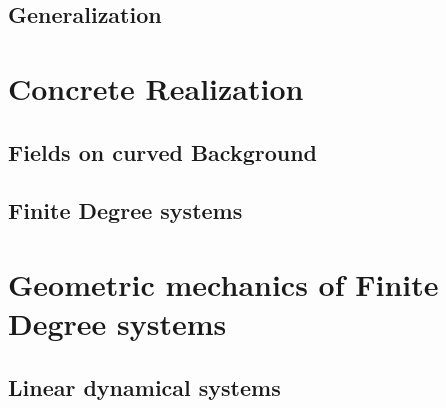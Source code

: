 \documentclass[Main]{subfiles}
\begin{document}
	
	
	
	
	
	
	\subsection{Generalization}
	
\newpage
	\section{Concrete Realization}
		\subsection{Fields on curved Background}
		\subsection{Finite Degree systems}
		
\newpage
	\section{Geometric mechanics of Finite Degree systems}
	
	\subsection{Linear dynamical systems}	
	
\newpage
\end{document}
